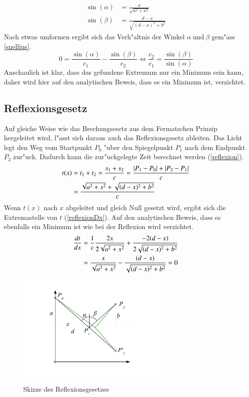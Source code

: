 \begin{align}
	\sin(\alpha) &= \frac{x}{\sqrt{a^2 + x^2}}  \label{substitution1}\\
	\sin(\beta) &= \frac{d-x}{\sqrt{(d -x)^2 + b^2}} \label{substitution2}
\end{align}
Nach etwas umformen ergibt sich das Verh"altnis der Winkel $\alpha \ \text{und} \ \beta$ gem"ass \eqref{snellius}.
\begin{equation}
	0 = \frac{\sin(\alpha)}{c_1} - \frac{\sin(\beta)}{c_2} \Leftrightarrow\frac{c_2}{c_1} = \frac{\sin(\beta)}{\sin(\alpha)}
	\label{snellius}
\end{equation}
Anschaulich ist klar, dass das gefundene Extremum nur ein Minimum
sein kann, daher
wird hier auf den analytischen Beweis, dass es ein Minimum ist, verzichtet.

\subsection{Reflexionsgesetz}
Auf gleiche Weise wie das Brechungsesetz aus dem Fermatschen Prinzip
hergeleitet wird, 
l"asst sich daraus auch das Reflexionsgesetz ableiten.
Das Licht legt den Weg vom Startpunkt $P_0$ "uber den Spiegelpunkt $P_1$ 
nach dem Endpunkt $P_2$ zur"uck. Dadurch kann die zur"uckgelegte Zeit
berechnet werden \cite{Wikipedia} (\eqref{reflexion}).
\begin{align}
t(x) &= t_1 + t_2 = \frac{s_1 + s_2}{c} = \frac{|P_1 - P_0| + |P_2 - P_1|}{c} \notag \\
&= \frac{\sqrt{a^2 + x^2} + \sqrt{(d-x)^2 + b^2}}{c} \label{reflexion}
\end{align}
Wenn $t(x)$ nach $x$ abgeleitet und gleich Null gesetzt wird, ergibt
sich die Extremastelle  von $t$ (\eqref{reflexionDx}).
Auf den analytischen Beweis, dass es ebenfalls ein Minimum ist wie bei
der Reflexion wird verzichtet.
\begin{align}
\frac{dt}{dx} &= \frac{1}{c}  \frac{2  x}{2  \sqrt{a^2 + x^2}} + \frac{-2  (d-x)}{2  \sqrt{(d-x)^2 + b^2}} \notag \\
&= \frac{x}{ \sqrt{a^2 + x^2}} - \frac{(d-x)}{ \sqrt{(d-x)^2 + b^2}} = 0 \label{reflexionDx}
\end{align}
\begin{figure}[H]
\begin{center}
	\includegraphics[width=0.7\textwidth]{licht/picture/Spiegelung.pdf}
	\caption{Skizze des Reflexionsgesetzes}
	\label{Ab:spiegelung}
\end{center}
\end{figure}
